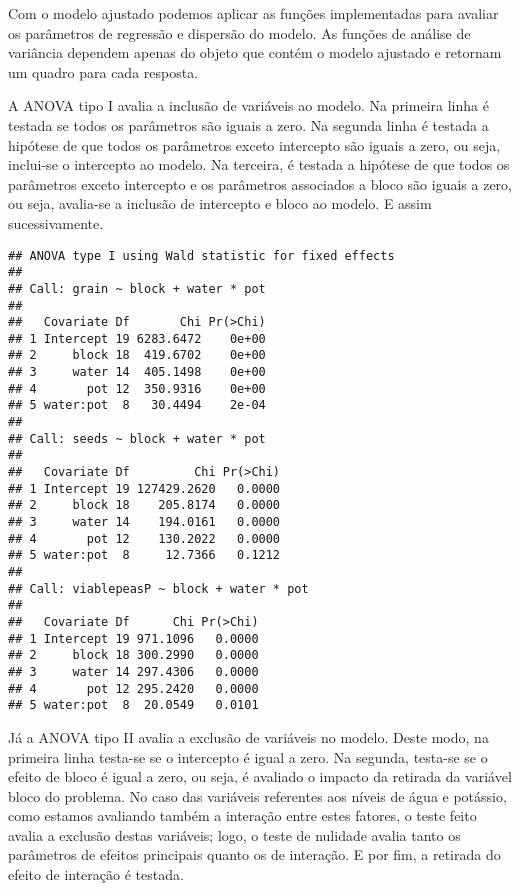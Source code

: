 Com o modelo ajustado podemos aplicar as funções implementadas para avaliar os parâmetros de regressão e dispersão do modelo. As funções de análise de variância dependem apenas do objeto que contém o modelo ajustado e retornam um quadro para cada resposta.


A ANOVA tipo I avalia a inclusão de variáveis ao modelo. Na primeira linha é testada se todos os parâmetros são iguais a zero. Na segunda linha é testada a hipótese de que todos os parâmetros exceto intercepto são iguais a zero, ou seja, inclui-se o intercepto ao modelo. Na terceira, é testada a hipótese de que todos os parâmetros exceto intercepto e os parâmetros associados a bloco são iguais a zero, ou seja, avalia-se a inclusão de intercepto e bloco ao modelo. E assim sucessivamente.

\begin{knitrout}
\color{fgcolor}\begin{kframe}
\begin{alltt}
\end{alltt}
\begin{verbatim}
## ANOVA type I using Wald statistic for fixed effects
## 
## Call: grain ~ block + water * pot
## 
##   Covariate Df       Chi Pr(>Chi)
## 1 Intercept 19 6283.6472    0e+00
## 2     block 18  419.6702    0e+00
## 3     water 14  405.1498    0e+00
## 4       pot 12  350.9316    0e+00
## 5 water:pot  8   30.4494    2e-04
## 
## Call: seeds ~ block + water * pot
## 
##   Covariate Df         Chi Pr(>Chi)
## 1 Intercept 19 127429.2620   0.0000
## 2     block 18    205.8174   0.0000
## 3     water 14    194.0161   0.0000
## 4       pot 12    130.2022   0.0000
## 5 water:pot  8     12.7366   0.1212
## 
## Call: viablepeasP ~ block + water * pot
## 
##   Covariate Df      Chi Pr(>Chi)
## 1 Intercept 19 971.1096   0.0000
## 2     block 18 300.2990   0.0000
## 3     water 14 297.4306   0.0000
## 4       pot 12 295.2420   0.0000
## 5 water:pot  8  20.0549   0.0101
\end{verbatim}
\end{kframe}
\end{knitrout}


Já a ANOVA tipo II avalia a exclusão de variáveis no modelo. Deste modo, na primeira linha testa-se se o intercepto é igual a zero. Na segunda, testa-se se o efeito de bloco é igual a zero, ou seja, é avaliado o impacto da retirada da variável bloco do problema. No caso das variáveis referentes aos níveis de água e potássio, como estamos avaliando também a interação entre estes fatores, o teste feito avalia a exclusão destas variáveis; logo, o teste de nulidade avalia tanto os parâmetros de efeitos principais quanto os de interação. E por fim, a retirada do efeito de interação é testada.

